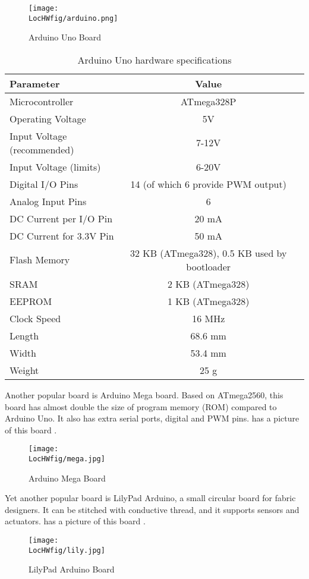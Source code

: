 \begin{figure}
  \centering
  \texttt{[image: \\LocHWfig/arduino.png]}
  \caption{Arduino Uno Board}
  \label{arduino}
\end{figure}

\begin{table}
\begin{center}
\begin{tabular}{ || l | c || r }
 \hline		
{\bf Parameter} & {\bf Value} \\ \hline	
 Microcontroller & ATmega328P\\
Operating Voltage & 5V\\
Input Voltage (recommended) & 7-12V\\
Input Voltage (limits) & 6-20V\\
Digital I/O Pins & 14 (of which 6 provide PWM output)\\
Analog Input Pins & 6\\
DC Current per I/O Pin & 20 mA\\
DC Current for 3.3V Pin & 50 mA\\
Flash Memory & 32 KB (ATmega328), 0.5 KB used by bootloader\\
SRAM & 2 KB (ATmega328)\\
EEPROM & 1 KB (ATmega328)\\
Clock Speed & 16 MHz\\
Length & 68.6 mm\\
Width & 53.4 mm\\
Weight & 25 g\\
 \hline 
\end{tabular}
\caption{Arduino Uno hardware specifications}
\label{micro-table}
\end{center}
\end{table}



Another popular board is Arduino Mega board.  Based on
ATmega2560, this board has almost double the size of program
memory (ROM) compared to Arduino Uno.  It also has extra serial ports,
digital and PWM pins.   has a picture of this board
\cite{mega-ref}. 
\begin{figure}
  \centering
  \texttt{[image: \\LocHWfig/mega.jpg]}
  \caption{Arduino Mega Board}
  \label{mega}
\end{figure}

Yet another popular board is LilyPad Arduino, a small circular
board for fabric designers. It can be stitched with conductive thread,
and it supports sensors and actuators.   has a picture of
this board \cite{lily-ref}.
\begin{figure}
  \centering
  \texttt{[image: \\LocHWfig/lily.jpg]}
  \caption{LilyPad Arduino Board}
  \label{lily}
\end{figure}

